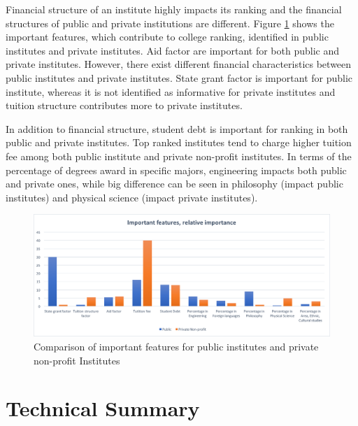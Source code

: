 \documentclass[11pt,letter]{article}
\begin{document}

Financial structure of an institute highly impacts its ranking and the financial structures of public and private institutions are different. Figure \ref{fig:publicprivate} shows the important features, which contribute to college ranking, identified in public institutes and private institutes. Aid factor are important for both public and private institutes. However, there exist different financial characteristics between public institutes and private institutes. State grant factor is important for public institute, whereas it is not identified as informative for private institutes and tuition structure contributes more to private institutes.

In addition to financial structure, student debt is important for ranking in both public and private institutes. Top ranked institutes tend to charge higher tuition fee among both public institute and private non-profit institutes. In terms of the percentage of degrees award in specific majors, engineering impacts both public and private ones, while big difference can be seen in philosophy (impact public institutes) and physical science (impact private institutes). 



\begin{figure}[H]
\vspace{-5mm}
\begin{center}
\includegraphics[scale=0.6]{PublicPrivateGB}
\caption{Comparison of important features for public institutes and private non-profit Institutes}\label{fig:publicprivate}
\end{center}
\vspace{-3mm}
\end{figure}


\vspace{-3mm}
\section{Technical Summary}
\end{document}

